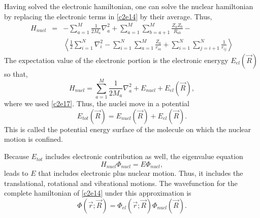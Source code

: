 Having solved the electronic hamiltonian, one can solve the nuclear hamiltonian
by replacing the electronic terms in \eqref{c2e14} by their average. Thus, 
\begin{eqnarray}
H_{nucl} &=& -\sum_{a=1}^M\frac{1}{2M_a}\nabla_a^2 +
\sum_{a=1}^M\sum_{b=a+1}^M\frac{Z_aZ_b}{R_{ab}} - \nonumber \\
& & \left\langle\frac{1}{2}\sum_{i=1}^N\nabla_i^2 - 
\sum_{i=1}^N\sum_{a=1}^M\frac{Z_a}{r_{ia}} +
\sum_{i=1}^N\sum_{j=i+1}^N\frac{1}{r_{ij}}\right\rangle \label{c2e18}
\end{eqnarray}
The expectation value of the electronic portion is the electronic enerygy 
$E_{el}(\vec{R})$ so that,
\begin{equation}\label{c2e19}
H_{nucl} = \sum_{a=1}^M\frac{1}{2M_a}\nabla_a^2 + E_{nucl} + 
E_{el}(\vec{R}),
\end{equation}
where we used \eqref{c2e17}. Thus, the nuclei move in a potential
\begin{equation}\label{c2e20}
E_{tot}(\vec{R}) = E_{nucl}(\vec{R}) + E_{el}(\vec{R}).
\end{equation}
This is called the potential energy surface of the molecule on which the
nuclear motion is confined.

Because $E_{tot}$ includes electronic contribution as well, the eigenvalue 
equation
\begin{equation}\label{c2e21}
H_{nucl}\Phi_{nucl} = E\Phi_{nucl},
\end{equation}
leads to $E$ that includes electronic plus nuclear motion. Thus, it
includes the translational, rotational and vibrational motions. The wavefunction
for the complete hamiltonian of \eqref{c2e14} under this approximation is
\begin{equation}\label{c2e22}
\Phi(\vec{r}; \vec{R}) = \Phi_{el}(\vec{r}; \vec{R})\Phi_{nucl}(\vec{R}).
\end{equation}

